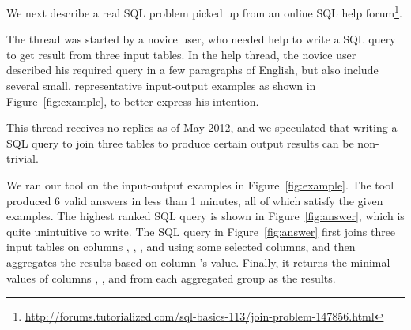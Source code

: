 We next describe a real SQL problem picked up from
an online SQL help forum\footnote{\url{http://forums.tutorialized.com/sql-basics-113/join-problem-147856.html}}.

The thread was started by a novice user, who needed help to write a
SQL query to get result from three input tables. In the help thread, the
novice user described his required query in a few paragraphs of
English, but also include several small, representative input-output
examples as shown in Figure~\ref{fig:example}, to better express
his intention. 

This thread receives no replies as of May 2012, and we speculated that
writing a SQL query to join three tables to produce certain output results
can be non-trivial.

We ran our tool on the input-output examples
in Figure~\ref{fig:example}. The tool produced 6 valid answers
in less than 1 minutes, all of which satisfy the given examples. The
highest ranked SQL query is shown in Figure~\ref{fig:answer},
which is quite unintuitive to write. The SQL query in Figure~\ref{fig:answer}
first joins three input tables
on columns , ,
, and  using some
selected columns, and then aggregates the results based on
column 's value. Finally, it
returns the minimal values of columns , , and 
from each aggregated group as the results.



